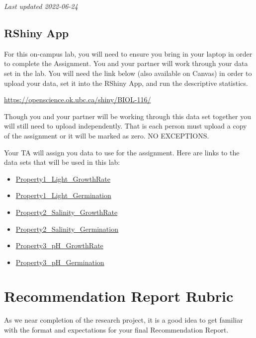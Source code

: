 \documentclass[
]{book}
\providecommand{\tightlist}{%
  \setlength{\itemsep}{0pt}\setlength{\parskip}{0pt}}
\begin{document}
\emph{Last updated 2022-06-24}

\hypertarget{rshiny-app}{%
\subsection*{RShiny App}\label{rshiny-app}}

For this on-campus lab, you will need to ensure you bring in your laptop in order to complete the Assignment. You and your partner will work through your data set in the lab. You will need the link below (also available on Canvas) in order to upload your data, set it into the RShiny App, and run the descriptive statistics.

\url{https://openscience.ok.ubc.ca/shiny/BIOL-116/}

Though you and your partner will be working through this data set together you will still need to upload independently. That is each person must upload a copy of the assignment or it will be marked as zero. NO EXCEPTIONS.

Your TA will assign you data to use for the assignment. Here are links to the data sets that will be used in this lab:

\begin{itemize}
\tightlist
\item
  \href{files/Property1_Light_GrowthRate.csv}{Property1\_Light\_GrowthRate}
\item
  \href{files/Property1_Light_Germination.csv}{Property1\_Light\_Germination}
\item
  \href{files/Property2_Salinity_GrowthRate.csv}{Property2\_Salinity\_GrowthRate}
\item
  \href{files/Property2_Salinity_Germination.csv}{Property2\_Salinity\_Germination}
\item
  \href{files/Property1_pH_GrowthRate.csv}{Property3\_pH\_GrowthRate}
\item
  \href{files/Property1_pH_Germination.csv}{Property3\_pH\_Germination}
\end{itemize}

\hypertarget{recommendation-report-rubric}{%
\section*{Recommendation Report Rubric}\label{recommendation-report-rubric}}

As we near completion of the research project, it is a good idea to get familiar with the format and expectations for your final Recommendation Report.
\end{document}
